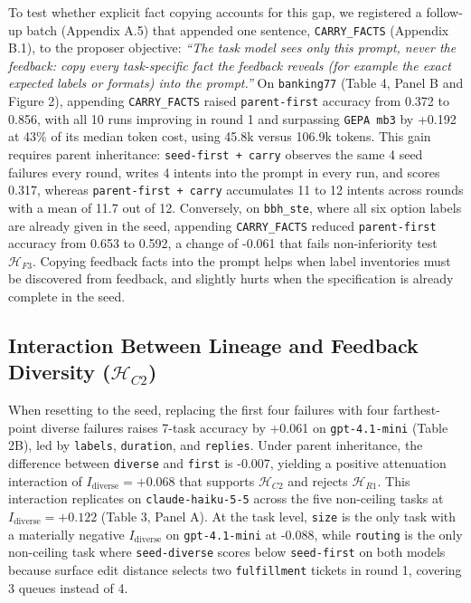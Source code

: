 \documentclass[10pt]{article}
\begin{document}
To test whether explicit fact copying accounts for this gap, we
registered a follow-up batch (Appendix A.5) that appended one sentence,
\texttt{CARRY\_FACTS} (Appendix B.1), to the proposer objective:
\emph{``The task model sees only this prompt, never the feedback: copy
every task-specific fact the feedback reveals (for example the exact
expected labels or formats) into the prompt.''} On \texttt{banking77}
(Table 4, Panel B and Figure 2), appending \texttt{CARRY\_FACTS} raised
\texttt{parent-first} accuracy from 0.372 to 0.856, with all 10 runs
improving in round 1 and surpassing \texttt{GEPA\ mb3} by +0.192 at 43\%
of its median token cost, using 45.8k versus 106.9k tokens. This gain
requires parent inheritance: \texttt{seed-first\ +\ carry} observes the
same 4 seed failures every round, writes 4 intents into the prompt in
every run, and scores 0.317, whereas \texttt{parent-first\ +\ carry}
accumulates 11 to 12 intents across rounds with a mean of 11.7 out of
12. Conversely, on \texttt{bbh\_ste}, where all six option labels are
already given in the seed, appending \texttt{CARRY\_FACTS} reduced
\texttt{parent-first} accuracy from 0.653 to 0.592, a change of -0.061
that fails non-inferiority test \(\mathcal{H}_{F3}\). Copying feedback
facts into the prompt helps when label inventories must be discovered
from feedback, and slightly hurts when the specification is already
complete in the seed.

\hypertarget{interaction-between-lineage-and-feedback-diversity-mathcalh_c2}{%
\subsection{\texorpdfstring{Interaction Between Lineage and Feedback
Diversity
(\(\mathcal{H}_{C2}\))}{Interaction Between Lineage and Feedback Diversity (\textbackslash mathcal\{H\}\_\{C2\})}}\label{interaction-between-lineage-and-feedback-diversity-mathcalh_c2}}

When resetting to the seed, replacing the first four failures with four
farthest-point diverse failures raises 7-task accuracy by +0.061 on
\texttt{gpt-4.1-mini} (Table 2B), led by \texttt{labels},
\texttt{duration}, and \texttt{replies}. Under parent inheritance, the
difference between \texttt{diverse} and \texttt{first} is -0.007,
yielding a positive attenuation interaction of
\(I_{\text{diverse}} = +0.068\) that supports \(\mathcal{H}_{C2}\) and
rejects \(\mathcal{H}_{R1}\). This interaction replicates on
\texttt{claude-haiku-5-5} across the five non-ceiling tasks at
\(I_{\text{diverse}} = +0.122\) (Table 3, Panel A). At the task level,
\texttt{size} is the only task with a materially negative
\(I_{\text{diverse}}\) on \texttt{gpt-4.1-mini} at -0.088, while
\texttt{routing} is the only non-ceiling task where
\texttt{seed-diverse} scores below \texttt{seed-first} on both models
because surface edit distance selects two \texttt{fulfillment} tickets
in round 1, covering 3 queues instead of 4.
\end{document}
